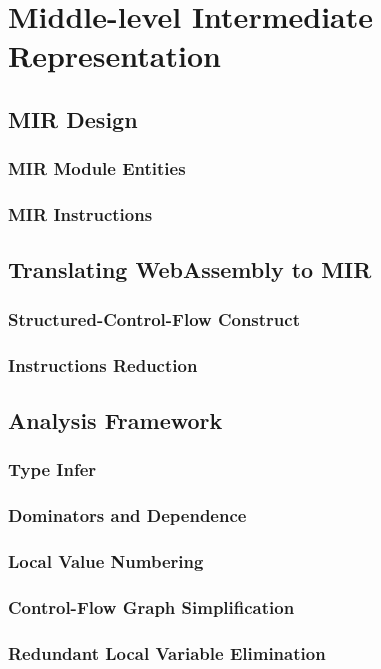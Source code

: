 \chapter{Middle-level Intermediate Representation}

\section{MIR Design}

\subsection{MIR Module Entities}

\subsection{MIR Instructions}


\section{Translating WebAssembly to MIR}

\subsection{Structured-Control-Flow Construct}

\subsection{Instructions Reduction}

\section{Analysis Framework}

\subsection{Type Infer}

\subsection{Dominators and Dependence}

\subsection{Local Value Numbering}

\subsection{Control-Flow Graph Simplification}

\subsection{Redundant Local Variable Elimination}
